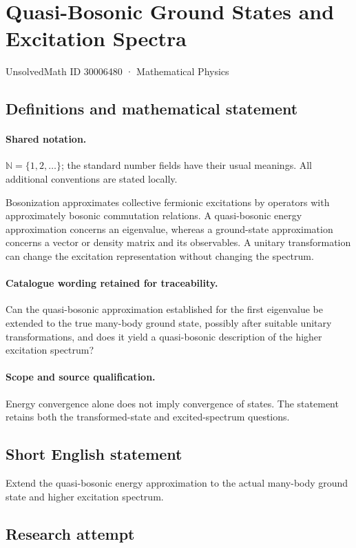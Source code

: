 \documentclass[11pt]{article}
\begin{document}
\setcounter{section}{30006479}
\section{Quasi-Bosonic Ground States and Excitation Spectra}\label{30006480}
{\small UnsolvedMath ID 30006480 · Mathematical Physics}
\subsection{Definitions and mathematical statement}

\paragraph{Shared notation.}$\mathbb N=\{1,2,\ldots\}$; the standard number fields have their usual meanings. All additional conventions are stated locally.


Bosonization approximates collective fermionic excitations by operators with approximately bosonic commutation relations. A quasi-bosonic energy approximation concerns an eigenvalue, whereas a ground-state approximation concerns a vector or density matrix and its observables. A unitary transformation can change the excitation representation without changing the spectrum.

\paragraph{Catalogue wording retained for traceability.}
Can the quasi-bosonic approximation established for the first eigenvalue be extended to the true many-body ground state, possibly after suitable unitary transformations, and does it yield a quasi-bosonic description of the higher excitation spectrum?

\paragraph{Scope and source qualification.}Energy convergence alone does not imply convergence of states. The statement retains both the transformed-state and excited-spectrum questions.
\subsection{Short English statement}
Extend the quasi-bosonic energy approximation to the actual many-body ground state and higher excitation spectrum.
\subsection{Research attempt}
\end{document}
